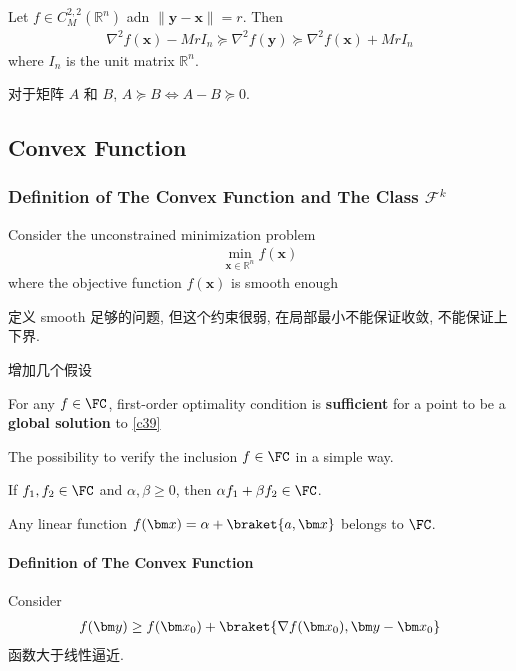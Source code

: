\begin{corollary}
    Let $f\in C_M^{2,2}(\mathbb{R}^n)$ adn $\|\bm y-\bm x\|=r$. Then 
    \begin{align*}
        \nabla^2f(\bm x)-Mr I_n \succeq \nabla ^2f(\bm y)\succeq \nabla^2f(\bm x)+Mr I_n
    \end{align*}
    where $I_n$ is the unit matrix $\mathbb{R}^n$. 
\end{corollary}


对于矩阵 $A$ 和 $B$, $A \succeq B \iff A-B\succeq 0$. 

\subsection{Convex Function}
\subsubsection{Definition of The Convex Function and The Class \texorpdfstring{$\mathcal{F}^k$}. }
Consider the unconstrained minimization problem
\begin{align}
    \min_{\bm x\in \mathbb{R}^n}f(\bm x)\label{c39}
\end{align}
where the objective function $f(\bm x)$ is smooth enough

定义 smooth 足够的问题, 但这个约束很弱, 在局部最小不能保证收敛, 不能保证上下界. 

增加几个假设 %
\begin{assumption}
    For any $f\in \FC$, first-order optimality condition is \textbf{sufficient} for a point to be a \textbf{global solution} to \ref{c39}
\end{assumption}

The possibility to verify the inclusion $f\in\FC$ in a simple way.

\begin{assumption}
    If $f_1,f_2\in \FC$ and $\alpha, \beta \ge 0$, then $\alpha f_1+\beta f_2\in \FC$. 
\end{assumption}
\begin{assumption}
    Any linear function $f(\bm x)=\alpha +\braket{a,\bm x}$ belongs to $\FC$. 
\end{assumption}
\paragraph{Definition of The Convex Function} Consider
\begin{align*}
    f(\bm y)\ge f(\bm x_0)+\braket{\nabla f(\bm x_0), \bm y-\bm x_0}
\end{align*}
函数大于线性逼近. 

